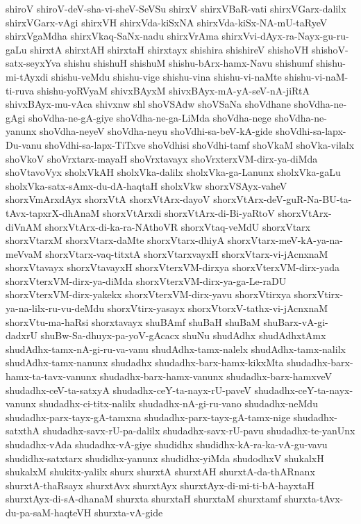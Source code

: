 {shiroV
shiroV-deV-sha-vi-sheV-SeVSu
shirxV
shirxVBaR-vati
shirxVGarx-dalilx
shirxVGarx-vAgi
shirxVH
shirxVda-kiSxNA
shirxVda-kiSx-NA-mU-taRyeV
shirxVgaMdha
shirxVkaq-SaNx-nadu
shirxVrAma
shirxVvi-dAyx-ra-Nayx-gu-ru-gaLu
shirxtA
shirxtAH
shirxtaH
shirxtayx
shishira
shishireV
shishoVH
shishoV-satx-seyxYva
shishu
shishuH
shishuM
shishu-bArx-hamx-Navu
shishumf
shishu-mi-tAyxdi
shishu-veMdu
shishu-vige
shishu-vina
shishu-vi-naMte
shishu-vi-naM-ti-ruva
shishu-yoRVyaM
shivxBAyxM
shivxBAyx-mA-yA-seV-nA-jiRtA
shivxBAyx-mu-vAca
shivxnw
shl
shoVSAdw
shoVSaNa
shoVdhane
shoVdha-ne-gAgi
shoVdha-ne-gA-giye
shoVdha-ne-ga-LiMda
shoVdha-nege
shoVdha-ne-yanunx
shoVdha-neyeV
shoVdha-neyu
shoVdhi-sa-beV-kA-gide
shoVdhi-sa-lapx-Du-vanu
shoVdhi-sa-lapx-TiTxve
shoVdhisi
shoVdhi-tamf
shoVkaM
shoVka-vilalx
shoVkoV
shoVrxtarx-mayaH
shoVrxtavayx
shoVrxterxVM-dirx-ya-diMda
shoVtavoVyx
sholxVkAH
sholxVka-dalilx
sholxVka-ga-Lanunx
sholxVka-gaLu
sholxVka-satx-sAmx-du-dA-haqtaH
sholxVkw
shorxVSAyx-vaheV
shorxVmArxdAyx
shorxVtA
shorxVtArx-dayoV
shorxVtArx-deV-guR-Na-BU-ta-tAvx-tapxrX-dhAnaM
shorxVtArxdi
shorxVtArx-di-Bi-yaRtoV
shorxVtArx-diVnAM
shorxVtArx-di-ka-ra-NAthoVR
shorxVtaq-veMdU
shorxVtarx
shorxVtarxM
shorxVtarx-daMte
shorxVtarx-dhiyA
shorxVtarx-meV-kA-ya-na-meVvaM
shorxVtarx-vaq-titxtA
shorxVtarxvayxH
shorxVtarx-vi-jAcnxnaM
shorxVtavayx
shorxVtavayxH
shorxVterxVM-dirxya
shorxVterxVM-dirx-yada
shorxVterxVM-dirx-ya-diMda
shorxVterxVM-dirx-ya-ga-Le-raDU
shorxVterxVM-dirx-yakekx
shorxVterxVM-dirx-yavu
shorxVtirxya
shorxVtirx-ya-na-lilx-ru-vu-deMdu
shorxVtirx-yasayx
shorxVtorxV-tathx-vi-jAcnxnaM
shorxVtu-ma-haRsi
shorxtavayx
shuBAmf
shuBaH
shuBaM
shuBarx-vA-gi-dadxrU
shuBw-Sa-dhuyx-pa-yoV-gAcacx
shuNu
shudAdhx
shudAdhxtAmx
shudAdhx-tamx-nA-gi-ru-va-vanu
shudAdhx-tamx-nalelx
shudAdhx-tamx-nalilx
shudAdhx-tamx-nanunx
shudadhx
shudadhx-barx-hamx-kikxMta
shudadhx-barx-hamx-ta-tavx-vanunx
shudadhx-barx-hamx-vanunx
shudadhx-barx-hamxveV
shudadhx-ceV-ta-satxyA
shudadhx-ceY-ta-nayx-rU-paveV
shudadhx-ceY-ta-nayx-vanunx
shudadhx-ci-titx-nalilx
shudadhx-nA-gi-ru-vano
shudadhx-neMdu
shudadhx-parx-tayx-gA-tamxna
shudadhx-parx-tayx-gA-tamx-nige
shudadhx-satxthA
shudadhx-savx-rU-pa-dalilx
shudadhx-savx-rU-pavu
shudadhx-te-yanUnx
shudadhx-vAda
shudadhx-vA-giye
shudidhx
shudidhx-kA-ra-ka-vA-gu-vavu
shudidhx-satxtarx
shudidhx-yanunx
shudidhx-yiMda
shudodhxV
shukalxH
shukalxM
shukitx-yalilx
shurx
shurxtA
shurxtAH
shurxtA-da-thARnanx
shurxtA-thaRsayx
shurxtAvx
shurxtAyx
shurxtAyx-di-mi-ti-bA-hayxtaH
shurxtAyx-di-sA-dhanaM
shurxta
shurxtaH
shurxtaM
shurxtamf
shurxta-tAvx-du-pa-saM-haqteVH
shurxta-vA-gide
}
